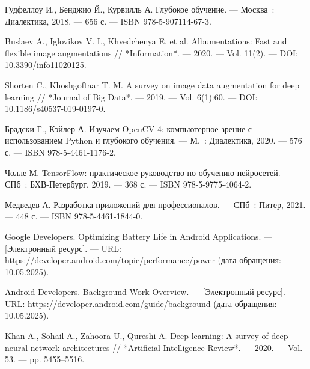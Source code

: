 \begin{thebibliography}{99}
	
	 Гудфеллоу И., Бенджио Й., Курвилль А. Глубокое обучение. — Москва~: Диалектика, 2018. — 656 с. — ISBN 978-5-907114-67-3.
	
	 Buslaev A., Iglovikov V. I., Khvedchenya E. et al. Albumentations: Fast and flexible image augmentations // *Information*. — 2020. — Vol. 11(2). — DOI: 10.3390/info11020125.
	
	 Shorten C., Khoshgoftaar T. M. A survey on image data augmentation for deep learning // *Journal of Big Data*. — 2019. — Vol. 6(1):60. — DOI: 10.1186/s40537-019-0197-0.
	
	 Брадски Г., Кэйлер А. Изучаем OpenCV 4: компьютерное зрение с использованием Python и глубокого обучения. — М.~: Диалектика, 2020. — 576 с. — ISBN 978-5-4461-1176-2.
	
	 Чолле М. TensorFlow: практическое руководство по обучению нейросетей. — СПб~: БХВ-Петербург, 2019. — 368 с. — ISBN 978-5-9775-4064-2.
	
	 Медведев А. Разработка приложений для профессионалов. — СПб~: Питер, 2021. — 448 с. — ISBN 978-5-4461-1844-0.
	
	 Google Developers. Optimizing Battery Life in Android Applications. — [Электронный ресурс]. — URL: \url{https://developer.android.com/topic/performance/power} (дата обращения: 10.05.2025).
	
	 Android Developers. Background Work Overview. — [Электронный ресурс]. — URL: \url{https://developer.android.com/guide/background} (дата обращения: 10.05.2025).
	
	 Khan A., Sohail A., Zahoora U., Qureshi A. Deep learning: A survey of deep neural network architectures // *Artificial Intelligence Review*. — 2020. — Vol. 53. — pp. 5455–5516.
	
\end{thebibliography}
